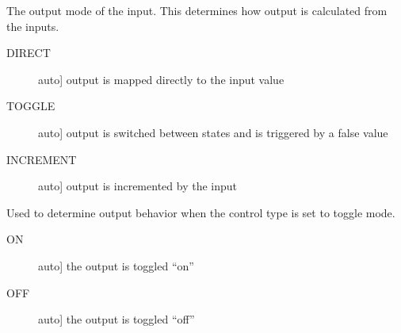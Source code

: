 \documentclass[letterpaper,10pt,english]{sphinxmanual}
\begin{document}

\begin{fulllineitems}
\label{\detokenize{base:OutputObject.ControlType}}
\sphinxAtStartPar
The output mode of the input. This determines how output is calculated from the inputs.

\sphinxAtStartPar
{}
\begin{description}
\item[{DIRECT}] \leavevmode{[}auto{]}
\sphinxAtStartPar
output is mapped directly to the input value

\item[{TOGGLE}] \leavevmode{[}auto{]}
\sphinxAtStartPar
output is switched between states and is triggered by a false value

\item[{INCREMENT}] \leavevmode{[}auto{]}
\sphinxAtStartPar
output is incremented by the input

\end{description}

\end{fulllineitems}


\begin{fulllineitems}
\label{\detokenize{base:OutputObject.ToggleState}}
\sphinxAtStartPar
Used to determine output behavior when the control type is set to toggle mode.

\sphinxAtStartPar
{}
\begin{description}
\item[{ON}] \leavevmode{[}auto{]}
\sphinxAtStartPar
the output is toggled “on”

\item[{OFF}] \leavevmode{[}auto{]}
\sphinxAtStartPar
the output is toggled “off”

\end{description}

\end{fulllineitems}
\end{document}
